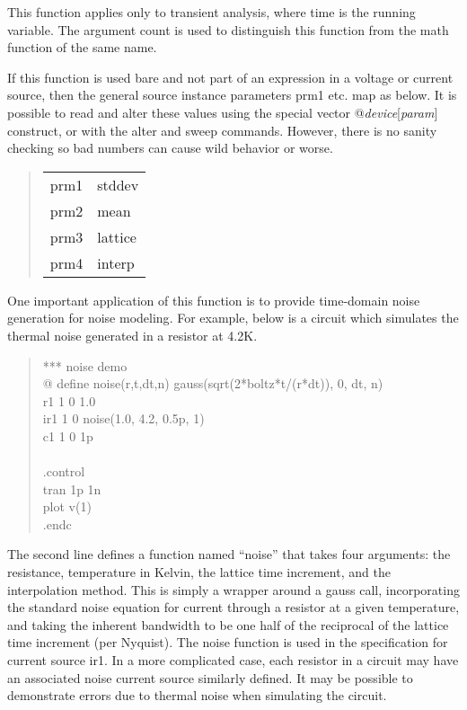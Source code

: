 This function applies only to transient analysis, where time is the
running variable.  The argument count is used to distinguish this
function from the math function of the same name.

If this function is used bare and not part of an expression in a
voltage or current source, then the general source instance parameters
{\vt prm1} etc.  map as below.  It is possible to read and alter these
values using the special vector @{\it device}[{\it param\/}]
construct, or with the {\cb alter} and {\cb sweep} commands.  However,
there is no sanity checking so bad numbers can cause wild behavior or
worse.

\begin{quote}
\begin{tabular}{ll}
prm1 & stddev\\
prm2 & mean\\
prm3 & lattice\\
prm4 & interp\\
\end{tabular}
\end{quote}

One important application of this function is to provide time-domain
noise generation for noise modeling\cite{jeffery}.  For example, below
is a circuit which simulates the thermal noise generated in a resistor
at 4.2K.
 
\begin{quote}\vt
*** noise demo\\
{\vt *@} define noise(r,t,dt,n) gauss(sqrt(2*boltz*t/(r*dt)), 0, dt, n)\\
r1 1 0 1.0\\
ir1 1 0 noise(1.0, 4.2, 0.5p, 1)\\
c1 1 0 1p\\
\\
.control\\
tran 1p 1n\\
plot v(1)\\
.endc\\
\end{quote}
 
The second line defines a function named ``noise'' that takes four
arguments:  the resistance, temperature in Kelvin, the lattice time
increment, and the interpolation method.  This is simply a wrapper
around a {\vt gauss} call, incorporating the standard noise equation
for current through a resistor at a given temperature, and taking the
inherent bandwidth to be one half of the reciprocal of the lattice
time increment (per Nyquist).  The noise function is used in the
specification for current source {\vt ir1}.  In a more complicated
case, each resistor in a circuit may have an associated noise current
source similarly defined.  It may be possible to demonstrate errors
due to thermal noise when simulating the circuit.

